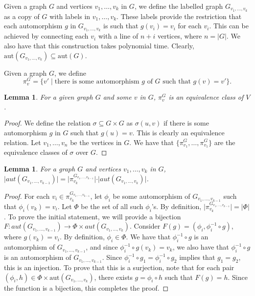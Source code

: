 \documentclass{article}
\def\aut{\mbox{aut}}
\newtheorem{lemma}[theo]{Lemma}
\begin{document}
Given a graph $G$ and vertices $v_1,\ldots,v_k$ in $G$, we define the labelled graph $G_{v_1,\ldots,v_k}$ as a copy of $G$ with labels in $v_1,\ldots,v_k$. These labels provide the restriction that each automorphism $g$ in $G_{v_1,\ldots,v_k}$ is such that $g(v_i) = v_i$ for each $v_i$. This can be achieved by connecting each $v_i$ with a line of $n+i$ vertices, where $n = \vert G \vert$. We also have that this construction takes polynomial time. Clearly, $\aut(G_{v_1,\ldots,v_k})\subseteq\aut(G)$.

Given a graph $G$, we define 
\[
\pi_{v}^G = \{v'\mid \mbox{there is some automorphism $g$ of $G$ such that $g(v) = v'$}\}.
\]

\begin{lemma}
	For a given graph $G$ and some $v$ in $G$, $\pi_v^G$ is an equivalence class of $V$.
\end{lemma}
\begin{proof}
	We define the relation $\sigma\subseteq G\times G$ as $\sigma(u,v)$ if there is some automorphism $g$ in $G$ such that $g(u) = v$. This is clearly an equivalence relation. Let $v_1,\ldots,v_n$ be the vertices in $G$. We have that $\{\pi_{v_1}^G,\ldots,\pi_{v_1}^G\}$ are the equivalence classes of $\sigma$ over $G$.
\end{proof}

\begin{lemma}\label{induc}
	For a graph $G$ and vertices $v_1,\ldots,v_k$ in $G$, $\vert aut(G_{v_1,\ldots,v_{k-1}}) \vert = \vert \pi_{v_k}^{G_{v_1,\ldots,v_{k-1}}} \vert \cdot \vert aut(G_{v_1,\ldots,v_k}) \vert$.
\end{lemma}
\begin{proof}
	For each $v_i\in\pi^{G_{v_1,\ldots,v_{k-1}}}_{v_k}$, let $\phi_i$ be some automorphism of $G_{v_1,\ldots,v_{k-1}}$ such that $\phi_i(v_k) = v_i$. Let $\Phi$ be the set of all such $\phi_i$'s. By definition, $\vert \pi_{v_k}^{G_{v_1,\ldots,v_{k-1}}} \vert = \vert \Phi \vert$. To prove the initial statement, we will provide a bijection $F:aut(G_{v_1,\ldots,v_{k-1}}) \to \Phi\times aut(G_{v_1,\ldots,v_k})$. Consider $F(g) = (\phi_i, \phi_i^{-1}\circ g)$, where $g(v_k) = v_i$. By definition, $\phi_i\in\Phi$. We have that $\phi_i^{-1}\circ g$ is an automorphism of $G_{v_1,\ldots,v_{k-1}}$, and since $\phi_i^{-1}\circ g(v_k) = v_k$, we also have that $\phi_i^{-1}\circ g$ is an automorphism of $G_{v_1,\ldots,v_{k-1}}$. Since $\phi_i^{-1}\circ g_1 = \phi_i^{-1} \circ g_2$ implies that $g_1 = g_2$, this is an injection. To prove that this is a surjection, note that for each pair $(\phi_i,h)\in\Phi\times\aut(G_{v_1,\ldots,v_k})$, there exists $g = \phi_i\circ h$ such that $F(g) = h$. Since the function is a bijection, this completes the proof.
\end{proof}	
\end{document}
